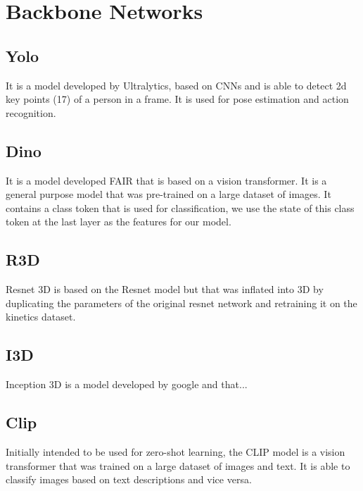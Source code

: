 \newpage
\appendix
\onecolumn

\section{Backbone Networks}



\subsection*{Yolo}
It is a model developed by Ultralytics, based on CNNs and is able to detect 2d key points (17) of a person in a frame. It is used for pose estimation and action recognition.

\subsection*{Dino}
It is a model developed FAIR that is based on a vision transformer. It is a general purpose model that was pre-trained on a large dataset of images. It contains a class token that is used for classification, we use the state of this class token at the last layer as the features for our model.

\subsection*{R3D}
Resnet 3D is based on the Resnet model but that was inflated into 3D by duplicating the parameters of the original resnet network  and retraining it on the kinetics dataset.

\subsection*{I3D}
Inception 3D is a model developed by google and that...

\subsection*{Clip}
Initially intended to be used for zero-shot learning, the CLIP model is a vision transformer that was trained on a large dataset of images and text. It is able to classify images based on text descriptions and vice versa.

